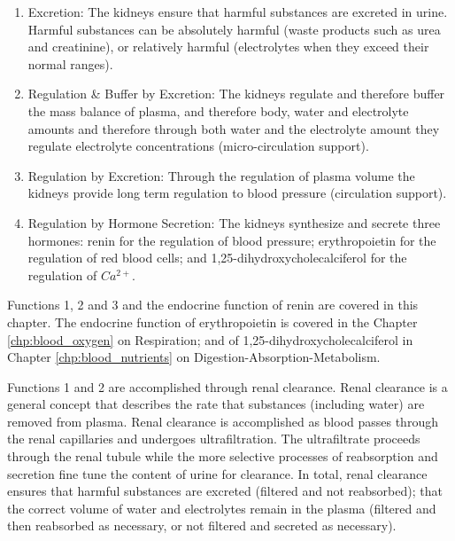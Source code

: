 \begin{enumerate}
    \item Excretion: The kidneys ensure that harmful substances are excreted in urine. Harmful substances can be absolutely harmful (waste products such as urea and creatinine), or relatively harmful (electrolytes when they exceed their normal ranges).
    \item Regulation \& Buffer by Excretion: The kidneys regulate and therefore buffer the mass balance of plasma, and therefore body, water and electrolyte amounts and therefore through both water and the electrolyte amount they regulate electrolyte concentrations (micro-circulation support).
    \item Regulation by Excretion: Through the regulation of plasma volume the kidneys provide long term regulation to blood pressure (circulation support).
    \item Regulation by Hormone Secretion: The kidneys synthesize and secrete three hormones: renin for the regulation of blood pressure; erythropoietin for the regulation of red blood cells; and 1,25-dihydroxycholecalciferol for the regulation of $Ca^{2+}$.
\end{enumerate}

Functions 1, 2 and 3 and the endocrine function of renin are covered in this chapter. The endocrine function of erythropoietin is covered in the Chapter \ref{chp:blood_oxygen} on Respiration; and of 1,25-dihydroxycholecalciferol in Chapter \ref{chp:blood_nutrients} on Digestion-Absorption-Metabolism.

Functions 1 and 2 are accomplished through renal clearance. Renal clearance is a general concept that describes the rate that substances (including water) are removed from plasma. Renal clearance is accomplished as blood passes through the renal capillaries and undergoes ultrafiltration. The ultrafiltrate proceeds through the renal tubule while the more selective processes of reabsorption and secretion fine tune the content of urine for clearance. In total, renal clearance ensures that harmful substances are excreted (filtered and not reabsorbed); that the correct volume of water and electrolytes remain in the plasma (filtered and then reabsorbed as necessary, or not filtered and secreted as necessary). 

